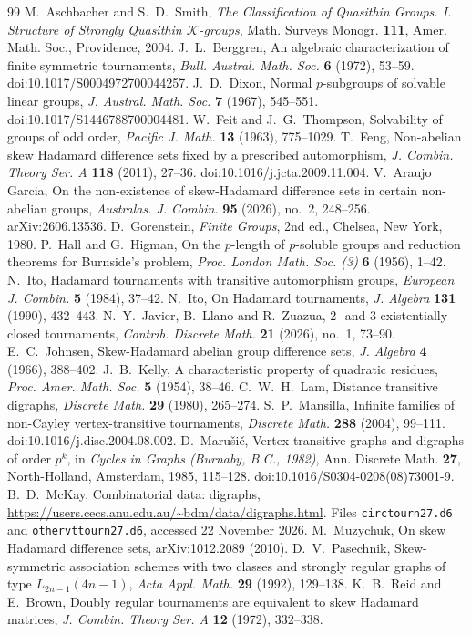 \documentclass[11pt]{amsart}
\theoremstyle{definition}
\theoremstyle{remark}
\begin{document}
\begin{thebibliography}{99}
 M.~Aschbacher and S.~D.~Smith, \emph{The Classification of Quasithin Groups. I. Structure of Strongly Quasithin $\mathcal{K}$-groups}, Math. Surveys Monogr. \textbf{111}, Amer. Math. Soc., Providence, 2004.
 J.~L.~Berggren, An algebraic characterization of finite symmetric tournaments, \emph{Bull. Austral. Math. Soc.} \textbf{6} (1972), 53--59. doi:10.1017/S0004972700044257.
 J.~D.~Dixon, Normal $p$-subgroups of solvable linear groups, \emph{J. Austral. Math. Soc.} \textbf{7} (1967), 545--551. doi:10.1017/S1446788700004481.
 W.~Feit and J.~G.~Thompson, Solvability of groups of odd order, \emph{Pacific J. Math.} \textbf{13} (1963), 775--1029.
 T.~Feng, Non-abelian skew Hadamard difference sets fixed by a prescribed automorphism, \emph{J. Combin. Theory Ser. A} \textbf{118} (2011), 27--36. doi:10.1016/j.jcta.2009.11.004.
 V.~Araujo Garcia, On the non-existence of skew-Hadamard difference sets in certain non-abelian groups, \emph{Australas. J. Combin.} \textbf{95} (2026), no.~2, 248--256. arXiv:2606.13536.
 D.~Gorenstein, \emph{Finite Groups}, 2nd ed., Chelsea, New York, 1980.
 P.~Hall and G.~Higman, On the $p$-length of $p$-soluble groups and reduction theorems for Burnside's problem, \emph{Proc. London Math. Soc. (3)} \textbf{6} (1956), 1--42.
 N.~Ito, Hadamard tournaments with transitive automorphism groups, \emph{European J. Combin.} \textbf{5} (1984), 37--42.
 N.~Ito, On Hadamard tournaments, \emph{J. Algebra} \textbf{131} (1990), 432--443.
 N.~Y.~Javier, B.~Llano and R.~Zuazua, 2- and 3-existentially closed tournaments, \emph{Contrib. Discrete Math.} \textbf{21} (2026), no.~1, 73--90.
 E.~C.~Johnsen, Skew-Hadamard abelian group difference sets, \emph{J. Algebra} \textbf{4} (1966), 388--402.
 J.~B.~Kelly, A characteristic property of quadratic residues, \emph{Proc. Amer. Math. Soc.} \textbf{5} (1954), 38--46.
 C.~W.~H.~Lam, Distance transitive digraphs, \emph{Discrete Math.} \textbf{29} (1980), 265--274.
 S.~P.~Mansilla, Infinite families of non-Cayley vertex-transitive tournaments, \emph{Discrete Math.} \textbf{288} (2004), 99--111. doi:10.1016/j.disc.2004.08.002.
 D.~Maru\v{s}i\v{c}, Vertex transitive graphs and digraphs of order $p^k$, in \emph{Cycles in Graphs (Burnaby, B.C., 1982)}, Ann. Discrete Math. \textbf{27}, North-Holland, Amsterdam, 1985, 115--128. doi:10.1016/S0304-0208(08)73001-9.
 B.~D.~McKay, Combinatorial data: digraphs, \url{https://users.cecs.anu.edu.au/~bdm/data/digraphs.html}. Files \texttt{circtourn27.d6} and \texttt{othervttourn27.d6}, accessed 22 November 2026.
 M.~Muzychuk, On skew Hadamard difference sets, arXiv:1012.2089 (2010).
 D.~V.~Pasechnik, Skew-symmetric association schemes with two classes and strongly regular graphs of type $L_{2n-1}(4n-1)$, \emph{Acta Appl. Math.} \textbf{29} (1992), 129--138.
 K.~B.~Reid and E.~Brown, Doubly regular tournaments are equivalent to skew Hadamard matrices, \emph{J. Combin. Theory Ser. A} \textbf{12} (1972), 332--338.
\end{thebibliography}
\end{document}
